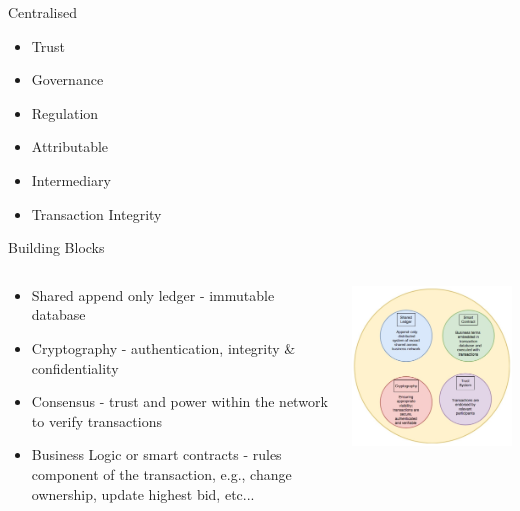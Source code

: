 \documentclass[pdf,table]{beamer}
\begin{document}
\begin{frame}{Centralised}
     	\begin{itemize}
       		\item Trust
       		\item Governance
       		\item Regulation
       		\item Attributable
       		\item Intermediary
       		\item Transaction Integrity
       	\end{itemize}
\end{frame}



\begin{frame}{Building Blocks}
	\begin{columns}[T]
		\begin{column}{0.45\textwidth}
			\begin{itemize}
				\item Shared append only ledger - immutable database
				\item Cryptography - authentication, integrity \& confidentiality
				\item Consensus - trust and power within the network to verify transactions
				\item Business Logic or smart contracts - rules component of the transaction, e.g., change ownership, update highest bid, etc...
			\end{itemize}
		\end{column}
		\begin{column}{0.50\textwidth}
			\includegraphics[scale=0.45]{buildingBlocks}
		\end{column}
	\end{columns}	
\end{frame}
\end{document}

